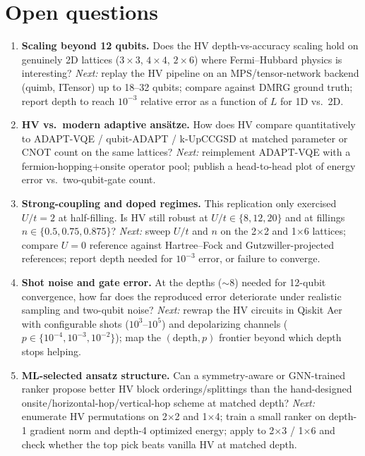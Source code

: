 \section{Open questions}
\begin{enumerate}
\item \textbf{Scaling beyond 12 qubits.} Does the HV depth-vs-accuracy scaling
      hold on genuinely 2D lattices ($3{\times}3$, $4{\times}4$, $2{\times}6$)
      where Fermi--Hubbard physics is interesting? \emph{Next:} replay the HV
      pipeline on an MPS/tensor-network backend (quimb, ITensor) up to 18--32
      qubits; compare against DMRG ground truth; report depth to reach $10^{-3}$
      relative error as a function of $L$ for 1D vs.\ 2D.
\item \textbf{HV vs.\ modern adaptive ans\"atze.} How does HV compare
      quantitatively to ADAPT-VQE / qubit-ADAPT / k-UpCCGSD at matched
      parameter or CNOT count on the same lattices? \emph{Next:} reimplement
      ADAPT-VQE with a fermion-hopping$+$onsite operator pool; publish a
      head-to-head plot of energy error vs.\ two-qubit-gate count.
\item \textbf{Strong-coupling and doped regimes.} This replication only
      exercised $U/t=2$ at half-filling. Is HV still robust at $U/t\in\{8,12,20\}$
      and at fillings $n\in\{0.5,0.75,0.875\}$? \emph{Next:} sweep $U/t$ and
      $n$ on the 2$\times$2 and 1$\times$6 lattices; compare $U=0$ reference
      against Hartree--Fock and Gutzwiller-projected references; report depth
      needed for $10^{-3}$ error, or failure to converge.
\item \textbf{Shot noise and gate error.} At the depths ($\sim8$) needed for
      12-qubit convergence, how far does the reproduced error deteriorate under
      realistic sampling and two-qubit noise? \emph{Next:} rewrap the HV
      circuits in Qiskit Aer with configurable shots ($10^3$--$10^5$) and
      depolarizing channels ($p\in\{10^{-4},10^{-3},10^{-2}\}$); map the
      $(\text{depth},p)$ frontier beyond which depth stops helping.
\item \textbf{ML-selected ansatz structure.} Can a symmetry-aware or
      GNN-trained ranker propose better HV block orderings/splittings than the
      hand-designed onsite/horizontal-hop/vertical-hop scheme at matched depth?
      \emph{Next:} enumerate HV permutations on 2$\times$2 and 1$\times$4;
      train a small ranker on depth-1 gradient norm and depth-4 optimized
      energy; apply to 2$\times$3 / 1$\times$6 and check whether the top pick
      beats vanilla HV at matched depth.
\end{enumerate}

